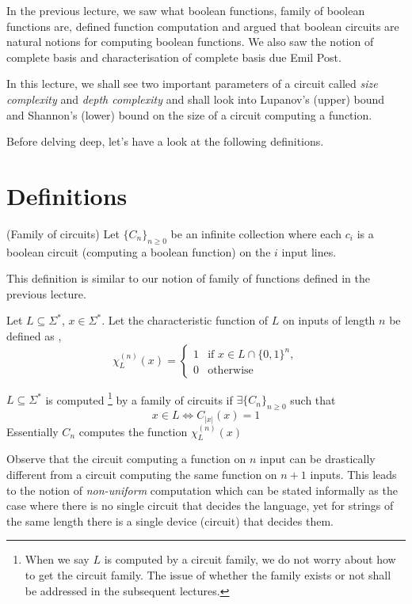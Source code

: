 

In the previous lecture, we saw what boolean functions, family of 
boolean functions are, defined function computation and argued that boolean 
circuits are natural notions for computing boolean functions. We also saw the 
notion of complete basis and characterisation of complete basis due Emil Post.

In this lecture, we shall see two important parameters of a circuit called 
\emph{size complexity} and \emph{depth complexity} and shall look into 
Lupanov's (upper) bound and Shannon's (lower) bound on the size of a circuit
computing a function.

Before delving deep, let's have a look at the following definitions.

\section{Definitions}
\begin{definition}(Family of circuits) Let $\{C_n\}_{n \ge 0}$ be an infinite
collection where each $c_i$ is a boolean circuit (computing a boolean
function) on the $i$ input lines.
\end{definition}
This definition is similar to our notion of family of functions defined in
the previous lecture.

\begin{definition}
Let $L \subseteq \Sigma^*$, $x \in \Sigma^*$. Let the characteristic function
of $L$ on inputs of length $n$ be defined as ,
\[
\chi_L^{(n)}(x) = 
	\begin{cases}
	1 & \text{if } x \in L \cap \{0,1\}^n, \\
	0 & \text{otherwise}
	\end{cases}
\]
\end{definition}

\begin{definition}
$L \subseteq \Sigma^*$ is computed \footnote{When we say $L$ is computed by a
circuit family, we do not worry about how to get the circuit family. The
issue of whether the family exists or not shall be addressed in the
subsequent lectures.} by a family of circuits if $\exists \{C_n\}_{n \ge 0}$
such that \[ x \in L \iff C_{|x|}(x) = 1 \]
Essentially $C_n$ computes the function $\chi_L^{(n)}(x)$
\end{definition}
Observe that the circuit computing a function on $n$ input can be
drastically different from a circuit computing the same function on $n+1$
inputs. This leads to the notion of \emph{non-uniform} computation which can
be stated informally as the case where there is no single circuit that
decides the language, yet for strings of the same length there is a single
device (circuit) that decides them.

